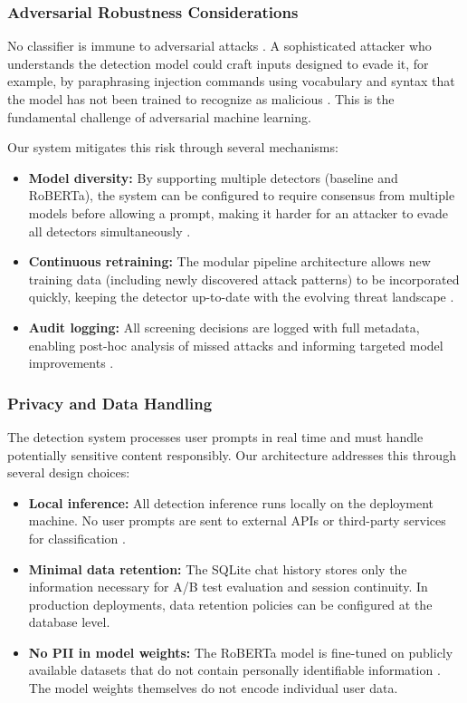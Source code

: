 \documentclass[12pt, letterpaper]{article}   %
\begin{document}
\subsubsection{Adversarial Robustness Considerations}

No classifier is immune to adversarial attacks \cite{ref3}\cite{ref43}. A sophisticated attacker who understands the detection model could craft inputs designed to evade it, for example, by paraphrasing injection commands using vocabulary and syntax that the model has not been trained to recognize as malicious \cite{ref25}\cite{ref26}. This is the fundamental challenge of adversarial machine learning.

Our system mitigates this risk through several mechanisms:

\begin{itemize}
    \item \textbf{Model diversity:} By supporting multiple detectors (baseline and RoBERTa), the system can be configured to require consensus from multiple models before allowing a prompt, making it harder for an attacker to evade all detectors simultaneously \cite{ref7}\cite{ref35}.
    \item \textbf{Continuous retraining:} The modular pipeline architecture allows new training data (including newly discovered attack patterns) to be incorporated quickly, keeping the detector up-to-date with the evolving threat landscape \cite{ref28}.
    \item \textbf{Audit logging:} All screening decisions are logged with full metadata, enabling post-hoc analysis of missed attacks and informing targeted model improvements \cite{ref32}.
\end{itemize}

\subsubsection{Privacy and Data Handling}

The detection system processes user prompts in real time and must handle potentially sensitive content responsibly. Our architecture addresses this through several design choices:

\begin{itemize}
    \item \textbf{Local inference:} All detection inference runs locally on the deployment machine. No user prompts are sent to external APIs or third-party services for classification \cite{ref32}.
    \item \textbf{Minimal data retention:} The SQLite chat history stores only the information necessary for A/B test evaluation and session continuity. In production deployments, data retention policies can be configured at the database level.
    \item \textbf{No PII in model weights:} The RoBERTa model is fine-tuned on publicly available datasets that do not contain personally identifiable information \cite{ref1}\cite{ref33}. The model weights themselves do not encode individual user data.
\end{itemize}
\end{document}
